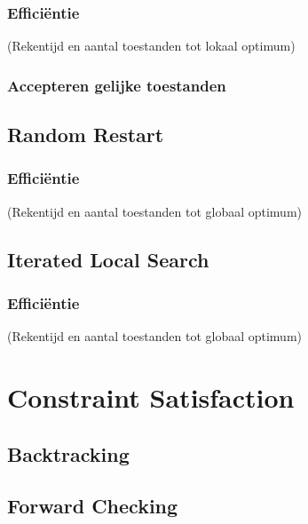 \documentclass[]{report}
\begin{document}
\subsubsection{Effici\"{e}ntie}
(Rekentijd en aantal toestanden tot lokaal optimum)
\subsubsection{Accepteren gelijke toestanden}
\subsection{Random Restart}
\subsubsection{Effici\"{e}ntie}
(Rekentijd en aantal toestanden tot globaal optimum)
\subsection{Iterated Local Search}
\subsubsection{Effici\"{e}ntie}
(Rekentijd en aantal toestanden tot globaal optimum)
\section{Constraint Satisfaction}
\subsection{Backtracking}
\subsection{Forward Checking}
\end{document}
